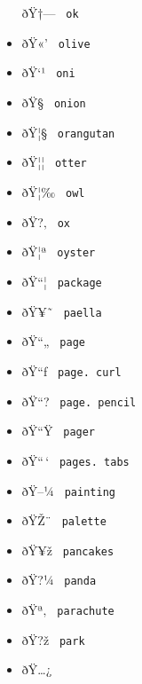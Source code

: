 \begin{itemize}
  \label{symbol-ok}{{ ðŸ†--- } \texttt{\ ok\ }}
\item
  \label{symbol-olive}{{ ðŸ«' } \texttt{\ olive\ }}
\item
  \label{symbol-oni}{{ ðŸ`¹ } \texttt{\ oni\ }}
\item
  \label{symbol-onion}{{ ðŸ§ } \texttt{\ onion\ }}
\item
  \label{symbol-orangutan}{{ ðŸ¦§ }
  \texttt{\ orangutan\ }}
\item
  \label{symbol-otter}{{ ðŸ¦¦ } \texttt{\ otter\ }}
\item
  \label{symbol-owl}{{ ðŸ¦‰ } \texttt{\ owl\ }}
\item
  \label{symbol-ox}{{ ðŸ?‚ } \texttt{\ ox\ }}
\item
  \label{symbol-oyster}{{ ðŸ¦ª } \texttt{\ oyster\ }}
\item
  \label{symbol-package}{{ ðŸ``¦ } \texttt{\ package\ }}
\item
  \label{symbol-paella}{{ ðŸ¥˜ } \texttt{\ paella\ }}
\item
  \label{symbol-page}{{ ðŸ``„ } \texttt{\ page\ }}
\item
  \label{symbol-page.curl}{{ ðŸ``ƒ }
  \texttt{\ page.\ curl\ }}
\item
  \label{symbol-page.pencil}{{ ðŸ``? }
  \texttt{\ page.\ pencil\ }}
\item
  \label{symbol-pager}{{ ðŸ``Ÿ } \texttt{\ pager\ }}
\item
  \label{symbol-pages.tabs}{{ ðŸ``\,` }
  \texttt{\ pages.\ tabs\ }}
\item
  \label{symbol-painting}{{ ðŸ--¼ }
  \texttt{\ painting\ }}
\item
  \label{symbol-palette}{{ ðŸŽ¨ } \texttt{\ palette\ }}
\item
  \label{symbol-pancakes}{{ ðŸ¥ž } \texttt{\ pancakes\ }}
\item
  \label{symbol-panda}{{ ðŸ?¼ } \texttt{\ panda\ }}
\item
  \label{symbol-parachute}{{ ðŸª‚ }
  \texttt{\ parachute\ }}
\item
  \label{symbol-park}{{ ðŸ?ž } \texttt{\ park\ }}
\item
  \label{symbol-parking}{{ ðŸ\ldots¿ }
}
\end{itemize}

